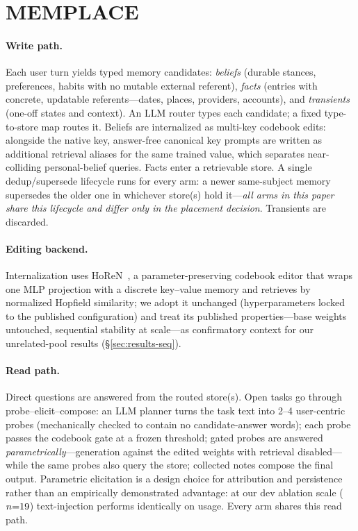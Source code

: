 \documentclass{article}
\begin{document}
\section{MEMPLACE}
\label{sec:system}

\paragraph{Write path.} Each user turn yields typed memory candidates: \emph{beliefs} (durable stances, preferences, habits with no mutable external referent), \emph{facts} (entries with concrete, updatable referents---dates, places, providers, accounts), and \emph{transients} (one-off states and context). An LLM router types each candidate; a fixed type-to-store map routes it. Beliefs are internalized as multi-key codebook edits: alongside the native key, answer-free canonical key prompts are written as additional retrieval aliases for the same trained value, which separates near-colliding personal-belief queries. Facts enter a retrievable store. A single dedup/supersede lifecycle runs for every arm: a newer same-subject memory supersedes the older one in whichever store(s) hold it---\emph{all arms in this paper share this lifecycle and differ only in the placement decision}. Transients are discarded.

\paragraph{Editing backend.} Internalization uses HoReN~\citep{horen2026}, a parameter-preserving codebook editor that wraps one MLP projection with a discrete key--value memory and retrieves by normalized Hopfield similarity; we adopt it unchanged (hyperparameters locked to the published configuration) and treat its published properties---base weights untouched, sequential stability at scale---as confirmatory context for our unrelated-pool results (\S\ref{sec:results-seq}).

\paragraph{Read path.} Direct questions are answered from the routed store(s). Open tasks go through probe--elicit--compose: an LLM planner turns the task text into 2--4 user-centric probes (mechanically checked to contain no candidate-answer words); each probe passes the codebook gate at a frozen threshold; gated probes are answered \emph{parametrically}---generation against the edited weights with retrieval disabled---while the same probes also query the store; collected notes compose the final output. Parametric elicitation is a design choice for attribution and persistence rather than an empirically demonstrated advantage: at our dev ablation scale ($n{=}19$) text-injection performs identically on usage. Every arm shares this read path.
\end{document}

